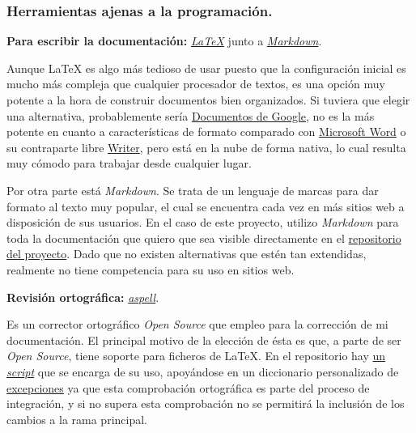 \subsubsection{Herramientas ajenas a la programación.}

\textbf{Para escribir la documentación:} \href{https://www.latex-project.org/}{\textit{LaTeX}} junto a \href{https://www.markdownguide.org/getting-started/}{\textit{Markdown}}.

Aunque LaTeX es algo más tedioso de usar puesto que la configuración inicial es mucho más compleja que cualquier procesador de textos, es una opción muy potente a la hora de construir documentos bien organizados. Si tuviera que elegir una alternativa, probablemente sería \href{https://workspace.google.com/intl/es/products/docs/}{Documentos de Google}, no es la más potente en cuanto a características de formato comparado con \href{https://www.microsoft.com/es-es/microsoft-365/word}{Microsoft Word} o su contraparte libre \href{https://es.libreoffice.org/descubre/writer/}{Writer}, pero está en la nube de forma nativa, lo cual resulta muy cómodo para trabajar desde cualquier lugar.

Por otra parte está \textit{Markdown}. Se trata de un lenguaje de marcas para dar formato al texto muy popular, el cual se encuentra cada vez en más sitios web a disposición de sus usuarios. En el caso de este proyecto, utilizo \textit{Markdown} para toda la documentación que quiero que sea visible directamente en el \href{https://github.com/Anglepi/My-Many-Reads}{repositorio del proyecto}. Dado que no existen alternativas que estén tan extendidas, realmente no tiene competencia para su uso en sitios web.

\textbf{Revisión ortográfica:} \href{http://aspell.net/}{\textit{aspell}}.

Es un corrector ortográfico \textit{Open Source} que empleo para la corrección de mi documentación. El principal motivo de la elección de ésta es que, a parte de ser \textit{Open Source}, tiene soporte para ficheros de LaTeX. En el repositorio hay \href{https://github.com/Anglepi/My-Many-Reads/blob/main/scripts/spellcheck.sh}{un \textit{script}} que se encarga de su uso, apoyándose en un diccionario personalizado de \href{https://github.com/Anglepi/My-Many-Reads/blob/main/scripts/spellcheckDictionary.txt}{excepciones} ya que esta comprobación ortográfica es parte del proceso de integración, y si no supera esta comprobación no se permitirá la inclusión de los cambios a la rama principal.

